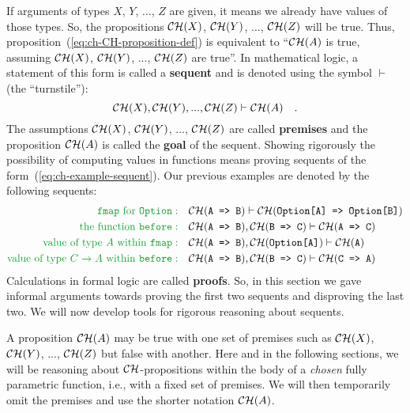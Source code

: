 If arguments of types $X$, $Y$, ..., $Z$ are given, it means we
already have values of those types. So, the propositions ${\cal CH}(X)$,
${\cal CH}(Y)$, ..., ${\cal CH}(Z)$ will be true. Thus, proposition~(\ref{eq:ch-CH-proposition-def})
is equivalent to \textsf{``}${\cal CH}(A)$ is true, assuming ${\cal CH}(X)$,
${\cal CH}(Y)$, ..., ${\cal CH}(Z)$ are true\textsf{''}. In mathematical
logic, a statement of this form is called a \textbf{sequent} and is
denoted using the symbol $\vdash$ (the \textsf{``}turnstile\textsf{''}):
\begin{equation}
{\cal CH}(X),{\cal CH}(Y),...,{\cal CH}(Z)\vdash{\cal CH}(A)\quad.\label{eq:ch-example-sequent}
\end{equation}
The assumptions ${\cal CH}(X)$, ${\cal CH}(Y)$, ..., ${\cal CH}(Z)$
are called \textbf{premises} and
the proposition ${\cal CH}(A)$ is called the \textbf{goal}
of the sequent. Showing rigorously the possibility of computing values
in functions means proving sequents of the form~(\ref{eq:ch-example-sequent}).
Our previous examples are denoted by the following sequents:
\begin{align*}
{\color{greenunder}\text{\texttt{fmap} for \texttt{Option}}:}\quad & {\cal CH}(\text{\texttt{A => B}})\vdash{\cal CH}(\text{\texttt{Option[A] => Option[B]}})\\
{\color{greenunder}\text{the function \texttt{before}}:}\quad & {\cal CH}(\text{\texttt{A => B}}),{\cal CH}(\text{\texttt{B => C}})\vdash{\cal CH}(\text{\texttt{A => C}})\\
{\color{greenunder}\text{value of type }A\text{ within \texttt{fmap}}:}\quad & {\cal CH}(\text{\texttt{A => B}}),{\cal CH}(\text{\texttt{Option[A]}})\vdash{\cal CH}(\text{\texttt{A}})\\
{\color{greenunder}\text{value of type }C\rightarrow A\text{ within \texttt{before}}:}\quad & {\cal CH}(\text{\texttt{A => B}}),{\cal CH}(\text{\texttt{B => C}})\vdash{\cal CH}(\text{\texttt{C => A}})
\end{align*}
Calculations in formal logic are called \textbf{proofs}.
So, in this section we gave informal arguments towards proving the
first two sequents and disproving the last two. We will now develop
tools for rigorous reasoning about sequents.

A proposition ${\cal CH}(A)$ may be true with one set of premises
such as ${\cal CH}(X)$, ${\cal CH}(Y)$, ..., ${\cal CH}(Z)$ but
false with another. Here and in the following sections, we will be
reasoning about ${\cal CH}$-propositions within the body of a \emph{chosen}
fully parametric function, i.e., with a fixed set of premises. We
will then temporarily omit the premises and use the shorter notation
${\cal CH}(A)$.

